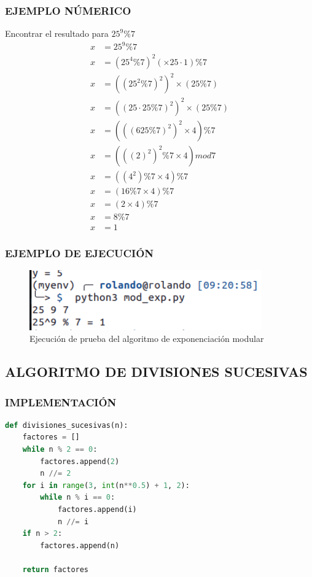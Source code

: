     \subsubsection{EJEMPLO NÚMERICO}
    Encontrar el resultado para $25^9 \% 7$
    \begin{align*} 
        x &=  25^9 \% 7\\ 
        x &=  (25^4 \% 7)^2 (\times 25\cdot1) \% 7 \\
        x &=  ((25^2 \% 7)^2)^2 \times (25 \% 7)\\
        x &=  ((25\cdot25 \% 7)^2)^2 \times (25 \% 7)\\
        x &=  (((625 \% 7)^2)^2 \times 4)\%7\\
        x &=  (((2)^2)^2 \% 7 \times 4) mod 7\\
        x &= ((4^2)\% 7 \times 4) \% 7\\
        x &= (16 \% 7 \times 4) \% 7 \\
        x &= (2 \times 4) \% 7 \\
        x &= 8 \% 7 \\
        x &= 1
    \end{align*}

    \subsubsection{EJEMPLO DE EJECUCIÓN}
    \begin{figure}[H]
        \centering
        \includegraphics[width=10cm]{images/mod_exp_prueba.png}
        \caption{Ejecución de prueba del algoritmo de exponenciación modular}
    \end{figure}

\subsection{ALGORITMO DE DIVISIONES SUCESIVAS}
    \subsubsection{IMPLEMENTACIÓN}
\begin{lstlisting}[language=Python]
def divisiones_sucesivas(n):
    factores = []
    while n % 2 == 0:
        factores.append(2)
        n //= 2
    for i in range(3, int(n**0.5) + 1, 2):
        while n % i == 0:
            factores.append(i)
            n //= i
    if n > 2:
        factores.append(n)
    
    return factores
\end{lstlisting}

